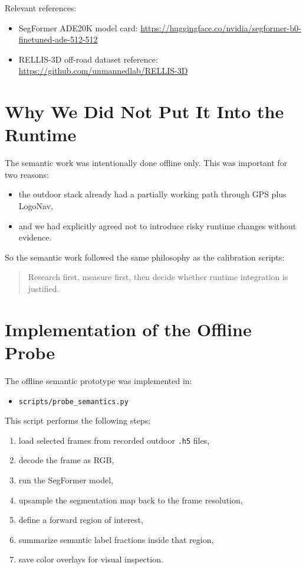 \documentclass[11pt]{article}
\begin{document}
Relevant references:
\begin{itemize}[leftmargin=*]
\item SegFormer ADE20K model card: \url{https://huggingface.co/nvidia/segformer-b0-finetuned-ade-512-512}
\item RELLIS-3D off-road dataset reference: \url{https://github.com/unmannedlab/RELLIS-3D}
\end{itemize}

\section{Why We Did Not Put It Into the Runtime}
The semantic work was intentionally done offline only. This was important for two reasons:
\begin{itemize}[leftmargin=*]
\item the outdoor stack already had a partially working path through GPS plus LogoNav,
\item and we had explicitly agreed not to introduce risky runtime changes without evidence.
\end{itemize}

So the semantic work followed the same philosophy as the calibration scripts:
\begin{quote}
Research first, measure first, then decide whether runtime integration is justified.
\end{quote}

\section{Implementation of the Offline Probe}
The offline semantic prototype was implemented in:
\begin{itemize}[leftmargin=*]
\item \texttt{scripts/probe\_semantics.py}
\end{itemize}

This script performs the following steps:
\begin{enumerate}[leftmargin=*]
\item load selected frames from recorded outdoor \texttt{.h5} files,
\item decode the frame as RGB,
\item run the SegFormer model,
\item upsample the segmentation map back to the frame resolution,
\item define a forward region of interest,
\item summarize semantic label fractions inside that region,
\item save color overlays for visual inspection.
\end{enumerate}
\end{document}
